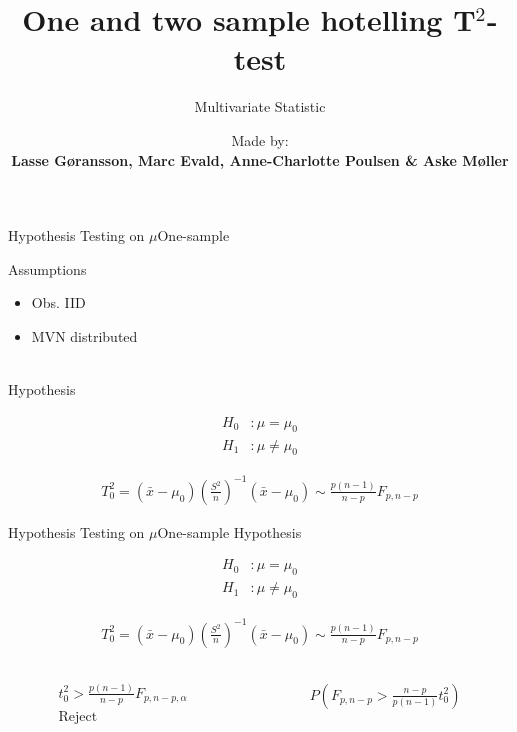\documentclass[aspectratio=169,10pt,t]{beamer}
\title{One and two sample hotelling T$^2$-test}
\subtitle{Multivariate Statistic}
\date{ }
\author{
    Made by: \\
    \textbf{Lasse Gøransson, Marc Evald, Anne-Charlotte Poulsen \& Aske Møller}
}
\institute[
  SDU Robotics\\
  The Maersk Mc-Kinney Moller Institute\\
  University of Southern Denmark
] %
{%
  SDU Robotics\\
  The Maersk Mc-Kinney Moller Institute\\
  University of Southern Denmark

}
\begin{document}
{\SDUwavesbg%
\begin{frame} %
  \titlepage
\end{frame}}


\begin{frame}{Hypothesis Testing on $\mu$}{One-sample}
    
   Assumptions 

   \begin{itemize}
       \item Obs. IID
       \item MVN distributed 
   \end{itemize}
   \\

   Hypothesis

    \begin{align*}
        H_0&: \mu = \mu_0\\
        H_1&: \mu \neq \mu_0
    \end{align*}
    
\begin{align*}
    T^2_0 = ( \bar{x} - \mu_0) \left(\frac{S^2}{n}\right)^{-1} ( \bar{x} -\mu_0 ) \sim \frac{p(n-1)}{n-p} F_{p,n-p}
\end{align*}

\end{frame}

\begin{frame}{Hypothesis Testing on $\mu$}{One-sample}
   Hypothesis

    \begin{align*}
        H_0&: \mu = \mu_0\\
        H_1&: \mu \neq \mu_0
    \end{align*}
    
\begin{align*}
    T^2_0 = ( \bar{x} - \mu_0) \left(\frac{S^2}{n}\right)^{-1} ( \bar{x} -\mu_0 ) \sim \frac{p(n-1)}{n-p} F_{p,n-p}
\end{align*}

    \begin{columns}
        \begin{column}{0.5\textwidth}
               \begin{align*}
               t^2_0 > \frac{p(n-1)}{n-p} F_{p,n-p,\alpha } \\
               \text{Reject}
               \end{align*}
        \end{column}
        \begin{column}{0.5\textwidth}
               \begin{align*}
                   P( F_{p,n-p} > \frac{n-p}{p(n-1)} t_0^2 )
               \end{align*}
        \end{column}
    \end{columns}


    
\end{frame}
\end{document}
